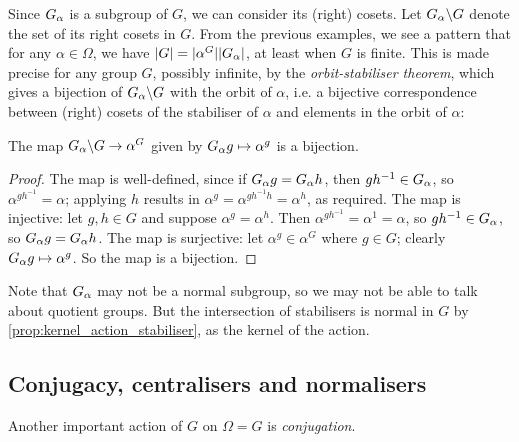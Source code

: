 Since $\added{2}{G_\alpha}$ is a subgroup of $G$, we can consider its (right) cosets. Let $\added{2}{G_\alpha} \backslash G$ denote the set of its right cosets in $G$. From the previous examples, we see a pattern that for any $\alpha \in \Omega$, we have $|G| = |\alpha^G| |\added{2}{G_\alpha}|$, at least when $G$ is finite. This is made precise for any group $G$, possibly infinite, by the \textit{orbit-stabiliser theorem}, which gives a bijection of $\added{2}{G_\alpha} \backslash G$ with the orbit of $\alpha$, i.e. a bijective correspondence between (right) cosets of the stabiliser of $\alpha$ and elements in the orbit of $\alpha$:

\begin{theorem}\label{thm:orbit_stabiliser}
     The map $\added{2}{G_\alpha} \backslash G \to \alpha^G$ given by $\added{2}{G_\alpha}g \mapsto \alpha^g$ is a bijection. 
\end{theorem}

\begin{proof}
    The map is well-defined, since if $\added{2}{G_\alpha}g = \added{2}{G_\alpha}h$, then $gh^{-1} \in \added{2}{G_\alpha}$, so $\alpha^{gh^{-1}} = \alpha$; applying $h$ results in $\alpha^g = \alpha^{gh^{-1}h} = \alpha^h$, as required. The map is injective: let $g,h \in G$ and suppose $\alpha^g = \alpha^h$. Then $\alpha^{gh^{-1}} = \alpha^1 = \alpha$, so $gh^{-1} \in \added{2}{G_\alpha}$, so $\added{2}{G_\alpha}g = \added{2}{G_\alpha}h$. The map is surjective: let $\alpha^g \in \alpha^G$ where $g \in G$; clearly $\added{2}{G_\alpha}g \mapsto \alpha^g$. So the map is a bijection.
\end{proof}

Note that $\added{2}{G_\alpha}$ may not be a normal subgroup, so we may not be able to talk about quotient groups. But the intersection of stabilisers is normal in $G$ by \autoref{prop:kernel_action_stabiliser}, as the kernel of the action.

\subsection{Conjugacy, centralisers and normalisers}

Another important action of $G$ on $\Omega = G$ is \textit{conjugation}. 

